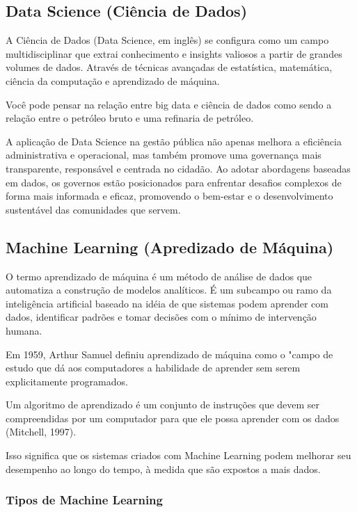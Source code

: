 \subsection{Data Science (Ciência de Dados)}

A Ciência de Dados (Data Science, em inglês) se configura como um campo multidisciplinar que extrai conhecimento e insights valiosos a partir de grandes volumes de dados. Através de técnicas avançadas de estatística, matemática, ciência da computação e aprendizado de máquina.\vskip0.3cm

Você pode pensar na relação entre big data e ciência de dados como sendo a relação entre o petróleo bruto e uma refinaria de petróleo.\vskip0.3cm

A aplicação de Data Science na gestão pública não apenas melhora a eficiência administrativa e operacional, mas também promove uma governança mais transparente, responsável e centrada no cidadão. Ao adotar abordagens baseadas em dados, os governos estão posicionados para enfrentar desafios complexos de forma mais informada e eficaz, promovendo o bem-estar e o desenvolvimento sustentável das comunidades que servem.


\subsection{Machine Learning (Apredizado de Máquina)}

O termo aprendizado de máquina é um método de análise de dados que automatiza a construção de modelos analíticos. É um subcampo ou ramo da inteligência artificial baseado na idéia de que sistemas podem aprender com dados, identificar padrões e tomar decisões com o mínimo de intervenção humana.\vskip0.3cm

Em 1959, Arthur Samuel definiu aprendizado de máquina como o "campo de estudo que dá aos computadores a habilidade de aprender sem serem explicitamente programados.\vskip0.3cm

Um algoritmo de aprendizado é um conjunto de instruções que devem ser compreendidas por um computador para que ele possa aprender com os dados (Mitchell, 1997).\vskip0.3cm

Isso significa que os sistemas criados com Machine Learning podem melhorar seu desempenho ao longo do tempo, à medida que são expostos a mais dados.


\subsubsection{Tipos de Machine Learning}


